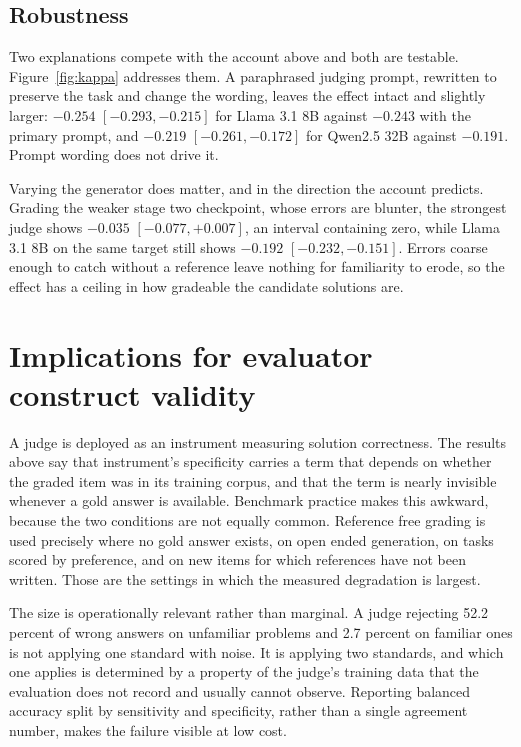 \documentclass{article}
\begin{document}
\subsection{Robustness}

Two explanations compete with the account above and both are testable.
Figure~\ref{fig:kappa} addresses them. A paraphrased judging prompt, rewritten to preserve
the task and change the wording, leaves the effect intact and slightly larger: $-0.254$
$[-0.293, -0.215]$ for Llama 3.1 8B against $-0.243$ with the primary prompt, and $-0.219$
$[-0.261, -0.172]$ for Qwen2.5 32B against $-0.191$. Prompt wording does not drive it.

Varying the generator does matter, and in the direction the account predicts. Grading the
weaker stage two checkpoint, whose errors are blunter, the strongest judge shows
$-0.035$ $[-0.077, +0.007]$, an interval containing zero, while Llama 3.1 8B on the same
target still shows $-0.192$ $[-0.232, -0.151]$. Errors coarse enough to catch without a
reference leave nothing for familiarity to erode, so the effect has a ceiling in how
gradeable the candidate solutions are.

\section{Implications for evaluator construct validity}

A judge is deployed as an instrument measuring solution correctness. The results above say
that instrument's specificity carries a term that depends on whether the graded item was in
its training corpus, and that the term is nearly invisible whenever a gold answer is
available. Benchmark practice makes this awkward, because the two conditions are not equally
common. Reference free grading is used precisely where no gold answer exists, on open ended
generation, on tasks scored by preference, and on new items for which references have not
been written. Those are the settings in which the measured degradation is largest.

The size is operationally relevant rather than marginal. A judge rejecting 52.2 percent of
wrong answers on unfamiliar problems and 2.7 percent on familiar ones is not applying one
standard with noise. It is applying two standards, and which one applies is determined by a
property of the judge's training data that the evaluation does not record and usually cannot
observe. Reporting balanced accuracy split by sensitivity and specificity, rather than a
single agreement number, makes the failure visible at low cost.
\end{document}
